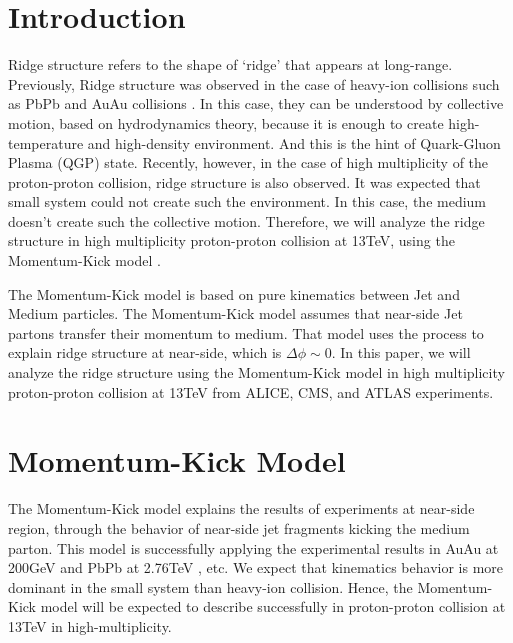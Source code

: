 \documentclass[%
 reprint,
 amsmath,amssymb,
 aps,
]{revtex4-2}
\begin{document}

\section{\label{sec:level1} Introduction}

Ridge structure refers to the shape of ‘ridge’ that appears at long-range.
Previously, Ridge structure was observed in the case of heavy-ion collisions such as PbPb \cite{ref1, ref2, ref3, ref4, ref5, ref6, ref7, ref8, ref9, ref10, ref11} 
and AuAu collisions \cite{ref12, ref13, ref14, ref15, ref16, ref17, ref18, ref19, ref20, ref21, ref22, ref23, ref24, ref25, ref26, ref27}. 
In this case, they can be understood by collective motion, based on hydrodynamics theory, because it is enough to create high-temperature and high-density environment.
And this is the hint of Quark-Gluon Plasma (QGP) state.
Recently, however, in the case of high multiplicity of the proton-proton collision, ridge structure is also observed.
It was expected that small system could not create such the environment. 
In this case, the medium doesn’t create such the collective motion.
Therefore, we will analyze the ridge structure in high multiplicity proton-proton collision at 13TeV, using the Momentum-Kick model \cite{Wong_2, Wong_3, Wong_4, Wong_5}.

The Momentum-Kick model is based on pure kinematics between Jet and Medium particles.
The Momentum-Kick model assumes that near-side Jet partons transfer their momentum to medium.
That model uses the process to explain ridge structure at near-side, which is $\Delta \phi \sim 0$.
In this paper, we will analyze the ridge structure using the Momentum-Kick model in high multiplicity proton-proton collision 
at 13TeV from ALICE, CMS, and ATLAS experiments.


\section{Momentum-Kick Model}


The Momentum-Kick model explains the results of experiments at near-side region, through the behavior of near-side jet fragments kicking the medium parton. 
This model is successfully applying the experimental results in AuAu at 200GeV \cite{Wong_1} and PbPb at 2.76TeV \cite{PbPb}, etc. 
We expect that kinematics behavior is more dominant in the small system than heavy-ion collision.
Hence, the Momentum-Kick model will be expected to describe successfully in proton-proton collision at 13TeV in high-multiplicity.
\end{document}
